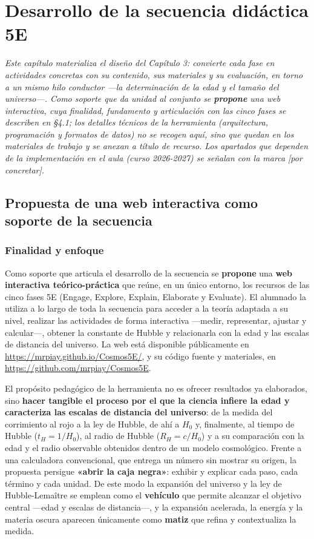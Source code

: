 \chapter{Desarrollo de la secuencia didáctica 5E}\label{cap:desarrollo}

\textit{Este capítulo materializa el diseño del Capítulo 3: convierte cada fase en actividades concretas con su contenido, sus materiales y su evaluación, en torno a un mismo hilo conductor ---la determinación de la edad y el tamaño del universo---. Como soporte que da unidad al conjunto se \textbf{propone} una web interactiva, cuya finalidad, fundamento y articulación con las cinco fases se describen en §4.1; los detalles técnicos de la herramienta (arquitectura, programación y formatos de datos) no se recogen aquí, sino que quedan en los materiales de trabajo y se anexan a título de recurso. Los apartados que dependen de la implementación en el aula (curso 2026-2027) se señalan con la marca \textnormal{[por concretar]}.}

\section{Propuesta de una web interactiva como soporte de la secuencia}\label{sec:appweb}

\subsection{Finalidad y enfoque}

Como soporte que articula el desarrollo de la secuencia se \textbf{propone} una \textbf{web interactiva teórico-práctica} que reúne, en un único entorno, los recursos de las cinco fases 5E (Engage, Explore, Explain, Elaborate y Evaluate). El alumnado la utiliza a lo largo de toda la secuencia para acceder a la teoría adaptada a su nivel, realizar las actividades de forma interactiva ---medir, representar, ajustar y calcular---, obtener la constante de Hubble y relacionarla con la edad y las escalas de distancia del universo. La web está disponible públicamente en \url{https://mrpiay.github.io/Cosmos5E/}, y su código fuente y materiales, en \url{https://github.com/mrpiay/Cosmos5E}.

El propósito pedagógico de la herramienta no es ofrecer resultados ya elaborados, sino \textbf{hacer tangible el proceso por el que la ciencia infiere la edad y caracteriza las escalas de distancia del universo}: de la medida del corrimiento al rojo a la ley de Hubble, de ahí a $H_{0}$ y, finalmente, al tiempo de Hubble ($t_H=1/H_{0}$), al radio de Hubble ($R_H=c/H_0$) y a su comparación con la edad y el radio observable obtenidos dentro de un modelo cosmológico. Frente a una calculadora convencional, que entrega un número sin mostrar su origen, la propuesta persigue \textbf{«abrir la caja negra»}: exhibir y explicar cada paso, cada término y cada unidad. De este modo la expansión del universo y la ley de Hubble-Lemaître se emplean como el \textbf{vehículo} que permite alcanzar el objetivo central ---edad y escalas de distancia---, y la expansión acelerada, la energía y la materia oscura aparecen únicamente como \textbf{matiz} que refina y contextualiza la medida.

